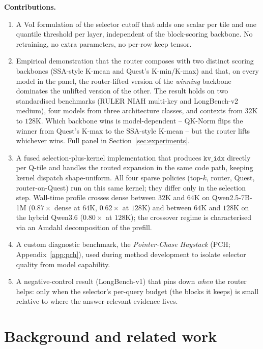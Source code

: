 \documentclass[11pt]{article}
\theoremstyle{remark}
\begin{document}
\textbf{Contributions.}
\begin{enumerate}[leftmargin=*,topsep=0.2em,itemsep=0.1em]
    \item A VoI formulation of the selector cutoff that adds one scalar per tile and one quantile threshold per layer, independent of the block-scoring backbone. No retraining, no extra parameters, no per-row keep tensor.
    \item Empirical demonstration that the router composes with two distinct scoring backbones (SSA-style K-mean and Quest's K-min/K-max) and that, on every model in the panel, the router-lifted version of the \emph{winning} backbone dominates the unlifted version of the other. The result holds on two standardised benchmarks (RULER NIAH multi-key and LongBench-v2 medium), four models from three architecture classes, and contexts from $32$K to $128$K. Which backbone wins is model-dependent -- QK-Norm flips the winner from Quest's K-max to the SSA-style K-mean -- but the router lifts whichever wins. Full panel in Section~\ref{sec:experiments}.
    \item A fused selection-plus-kernel implementation that produces $\texttt{kv\_idx}$ directly per Q-tile and handles the routed expansion in the same code path, keeping kernel dispatch shape-uniform. All four sparse policies (top-$k$, router, Quest, router-on-Quest) run on this same kernel; they differ only in the selection step. Wall-time profile crosses dense between $32$K and $64$K on Qwen2.5-7B-1M ($0.87\times$ dense at $64$K, $0.62\times$ at $128$K) and between $64$K and $128$K on the hybrid Qwen3.6 ($0.80\times$ at $128$K); the crossover regime is characterised via an Amdahl decomposition of the prefill.
    \item A custom diagnostic benchmark, the \emph{Pointer-Chase Haystack} (PCH; Appendix~\ref{app:pch}), used during method development to isolate selector quality from model capability.
    \item A negative-control result (LongBench-v1) that pins down \emph{when} the router helps: only when the selector's per-query budget (the blocks it keeps) is small relative to where the answer-relevant evidence lives.
\end{enumerate}

\section{Background and related work}
\end{document}
